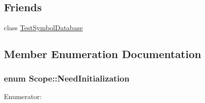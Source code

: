 \subsection*{Friends}
\begin{DoxyCompactItemize}
\item 
class \hyperlink{class_scope_afbc7132e3aa10bdc3945e17caa6d6879}{Test\-Symbol\-Database}
\end{DoxyCompactItemize}


\subsection{Member Enumeration Documentation}
\hypertarget{class_scope_a30cfddde990eaaa51f6e983dd6d4638e}{
\subsubsection[{Need\-Initialization}]{\setlength{\rightskip}{0pt plus 5cm}enum {\bf Scope\-::\-Need\-Initialization}}}\label{class_scope_a30cfddde990eaaa51f6e983dd6d4638e}
\begin{Desc}
\item[Enumerator\-: ]\par
\begin{description}
\item[{\em 
\hypertarget{class_scope_a30cfddde990eaaa51f6e983dd6d4638eac76b20fb6149b618b84d721da7b528bf}{Unknown}\label{class_scope_a30cfddde990eaaa51f6e983dd6d4638eac76b20fb6149b618b84d721da7b528bf}
}]\item[{\em 
\hypertarget{class_scope_a30cfddde990eaaa51f6e983dd6d4638ead2f83dc4f67ae6d93be53f445311665c}{True}\label{class_scope_a30cfddde990eaaa51f6e983dd6d4638ead2f83dc4f67ae6d93be53f445311665c}
}]\item[{\em 
\hypertarget{class_scope_a30cfddde990eaaa51f6e983dd6d4638eae10ff320b925a5ca8fd9786ddd6b4613}{False}\label{class_scope_a30cfddde990eaaa51f6e983dd6d4638eae10ff320b925a5ca8fd9786ddd6b4613}
}]\end{description}
\end{Desc}

